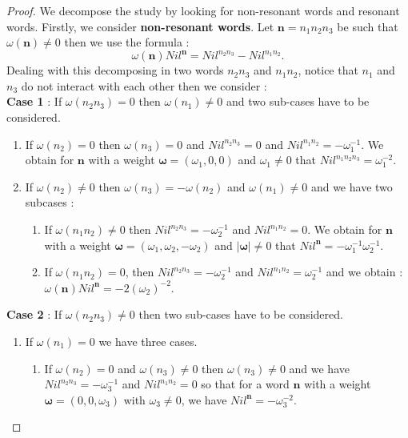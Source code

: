 \documentclass[english,11pt]{amsart}
\def\nn{\mathbf{n}}
\def\nn{\mathbf{n}}
\def\oo{\boldsymbol\omega}
\def\o{\omega}
\begin{document}
\begin{proof}
We decompose the study by looking for non-resonant words and resonant words.
Firstly, we consider \textbf{non-resonant words}. Let $\nn=n_1n_2n_3$ be such that $\o(\nn)\neq 0$ then we use the formula : 
$$\o(\nn)Nil^\nn = Nil^{n_2n_3} - Nil^{n_1n_2}.$$
Dealing with this decomposing in two words $n_2n_3$ and $n_1n_2$, notice that $n_1$ and $n_3$ do not interact with each other then we consider :\\
\textbf{Case 1} : If $\omega (n_2 n_3)=0$ then $\omega (n_1 )\not =0$ and two sub-cases have to be considered.
        \begin{enumerate}
            \item If $\omega (n_2 ) =0$ then $\omega (n_3 )=0$ and $Nil^{n_2 n_3} =0$ and $Nil^{n_1 n_2 } = -\omega_1^{-1}$. We obtain for $\nn$ with a weight $\oo = (\omega_1  , 0 ,0)$ and $\omega_1 \not= 0$ that $Nil^{n_1 n_2 n_3} =\omega_1^{-2}$.

            \item If $\omega (n_2)\not= 0$ then $\omega (n_3 ) =-\omega (n_2)$ and $\o(n_1) \neq 0$ and we have two subcases :
            \begin{enumerate}
                \item If $\omega (n_1 n_2) \not= 0$ then $Nil^{n_2 n_3} = -\omega_2^{-1}$ and $Nil^{n_1 n_2} =0$. We obtain for $\nn$ with a weight $\oo =(\omega_1  ,  \omega_2 , -\omega_2 )$ and $\mid \oo \mid \not= 0$ that $Nil^{\nn} =-\omega_1^{-1} \omega_2^{-1}$.
                \item If $\omega (n_1 n_2) = 0$, then $Nil^{n_2n_3}= -\o_2^{-1}$ and $Nil^{n_1n_2}= \o_2^{-1}$ and we obtain : $\o(\nn)Nil^\nn = -2(\o_2)^{-2} $.
            \end{enumerate}
        \end{enumerate}


 \textbf{Case 2} : If $\omega (n_2 n_3 )\not =0$ then two sub-cases have to be considered. 
    \begin{enumerate}
        \item If $\omega (n_1)=0$ we have three cases. 
        \begin{enumerate}
            \item If $\omega (n_2 )=0$ and $\o(n_3) \neq 0$ then $\omega (n_3)\not= 0$ and we have $Nil^{n_2 n_3} = -\omega_3^{-1}$ and $Nil^{n_1 n_2} = 0$ so that for a word $\nn$ with a weight $\oo = (0 ,0 ,\omega_3 )$ with $\omega_3\not= 0$, we have $Nil^{\nn} = -\omega_3^{-2}$. 


\end{enumerate}
\end{enumerate}
\end{proof}
\end{document}
